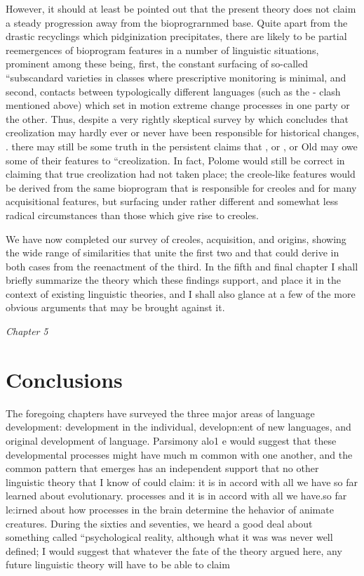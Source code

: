 However, it should at least be pointed out that the present theory does not claim a steady progression away from the biopro\-grarnmed base. Quite apart from the drastic recyclings which pidginiza\-tion precipitates, there are likely to be partial reemergences of bio\-program features in a number of linguistic situations, prominent among these being, first, the constant surfacing of so-called ``subscandard varieties in classes where prescriptive monitoring is minimal, and second, contacts between typologically different languages (such as the - clash mentioned above) which set in motion extreme change processes in one party or the other. Thus, despite a very rightly skeptical survey by \citet{Polome1980} which concludes that creolization may hardly ever or never have been responsible for histo\-rical changes, . there may still be some truth in the persistent claims that , or , or Old  may owe some of their features to ``creolization. In fact, Polome would still be correct in claiming that true creolization had not taken place; the creole-like features would be derived from the same bioprogram that is responsible for creoles and for many acquisitional features, but surfacing under rather different and somewhat less radical circumstances than those which give rise to creoles.

We have now completed our survey of creoles, acquisition, and origins, showing the wide range of similarities that unite the first two and that could derive in both cases from the reenactment of the third. In the fifth and final chapter I shall briefly summarize the theory which these findings support, and place it in the context of existing linguistic theories, and I shall also glance at a few of the more obvious arguments that may be brought against it.


\textit{Chapter} \textit{5}
\chapter{Conclusions}

The foregoing chapters have surveyed the three major areas of language development: development in the individual, developn:ent of new languages, and original development of language. Parsimony alo1 e would suggest that these developmental processes might have much m common with one another, and the common pattern that emerges has an independent support that no other linguistic theory that I know of could claim: it is in accord with all we have so far learned about evo\-lutionary. processes and it is in accord with all we have.so far le:irned about how processes in the brain determine the hehavior of animate creatures. During the sixties and seventies, we heard a good deal about something called ``psychological reality, although what it was was never well defined; I would suggest that whatever the fate of the theory argued here, any future linguistic theory will have to be able to claim

